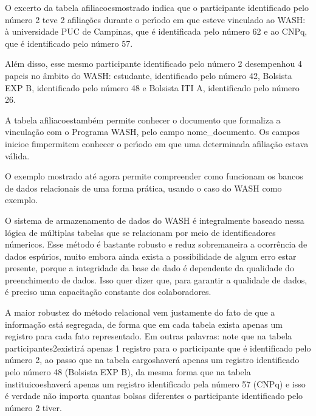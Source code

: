 \documentclass[
12pt,		%
openright,	%
twoside,  %
a4paper,			%
chapter=TITLE,		%
english,			%
french,				%
spanish,			%
brazil				%
]{USPSC-classe/USPSC}
\begin{document}
O excerto da tabela \textquotedbl afiliacoes\textquotedbl  mostrado indica que o participante identificado pelo n\'umero 2 teve 2 afilia\c{c}\~oes durante o per\'{\i}odo em que esteve vinculado ao WASH: \`a universidade PUC de Campinas, que \'e identificada pelo n\'umero 62 e ao CNPq, que \'e identificado pelo n\'umero 57.




Al\'em disso, esse mesmo participante identificado pelo n\'umero 2 desempenhou 4 papeis no \^ambito do WASH: estudante, identificado pelo n\'umero 42, Bolsista EXP B, identificado pelo n\'umero 48 e Bolsista ITI A, identificado pelo n\'umero 26.




A tabela \textquotedbl afiliacoes\textquotedbl  tamb\'em permite conhecer o documento que formaliza a vincula\c{c}\~ao com o Programa WASH, pelo campo nome\_documento. Os campos \textquotedbl inicio\textquotedbl  e \textquotedbl fim\textquotedbl  permitem conhecer o per\'{\i}odo em que uma determinada afilia\c{c}\~ao estava v\'alida.




O exemplo mostrado at\'e agora permite compreender como funcionam os bancos de dados relacionais de uma forma pr\'atica, usando o caso do WASH como exemplo.




O sistema de armazenamento de dados do WASH \'e integralmente baseado nessa l\'ogica de m\'ultiplas tabelas que se relacionam por meio de identificadores n\'umericos. Esse m\'etodo \'e bastante robusto e reduz sobremaneira a ocorr\^encia de dados esp\'urios, muito embora ainda exista a possibilidade de algum erro estar presente, porque a integridade da base de dado \'e dependente da qualidade do preenchimento de dados. Isso quer dizer que, para garantir a qualidade de dados, \'e preciso uma capacita\c{c}\~ao constante dos colaboradores.




A maior robustez do m\'etodo relacional vem justamente do fato de que a informa\c{c}\~ao est\'a segregada, de forma que em cada tabela exista apenas um registro para cada fato representado. Em outras palavras: note que na tabela \textquotedbl participantes2\textquotedbl  existir\'a apenas 1 registro para o participante que \'e identificado pelo n\'umero 2, ao passo que na tabela \textquotedbl cargos\textquotedbl  haver\'a apenas um registro identificado pelo n\'umero 48 (Bolsista EXP B), da mesma forma que na tabela \textquotedbl instituicoes\textquotedbl  haver\'a apenas um registro identificado pela n\'umero 57 (CNPq) e isso \'e verdade n\~ao importa quantas bolsas diferentes o participante identificado pelo n\'umero 2 tiver.
\end{document}
